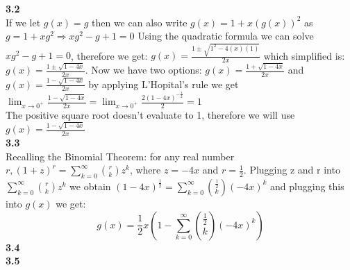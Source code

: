 \documentclass[10pt,a4paper]{report}
\begin{document}
	\newline
	\textbf{3.2}\\
	If we let $g(x) = g$ then we can also write $g(x) = 1 + x(g(x))^2$ as $g = 1 + xg^2 \Rightarrow xg^2 - g + 1 = 0$ Using the quadratic formula we can solve $xg^2 - g + 1 = 0$, therefore we get: $g(x) = \frac{1\pm\sqrt{1^2 - 4(x)(1)}}{2x}$ which simplified is: $g(x) = \frac{1\pm\sqrt{1-4x}}{2x}$.  Now we have two options: $g(x) = \frac{1 + \sqrt{1-4x}}{2x}$ and $g(x) = \frac{1 - \sqrt{1-4x}}{2x}$ by applying L'Hopital's rule we get $\lim_{x\to0^+}\frac{1-\sqrt{1-4x}}{2x} = \lim_{x\to0^+}\frac{2(1-4x)^{-\frac{1}{2}}}{2} = 1$\\
	The positive square root doesn't evaluate to 1, therefore we will use $g(x) = \frac{1 - \sqrt{1-4x}}{2x}$\\
	\newline
	\textbf{3.3}\\
	Recalling the Binomial Theorem: for any real number $r,(1+z)^r = \sum_{k=0}^{\infty}\binom{r}{k}z^k$, where $z = -4x$ and $r= \frac{1}{2}$.  Plugging z and r into $\sum_{k=0}^{\infty}\binom{r}{k}z^k$ we obtain $(1 - 4x)^{\frac{1}{2}} = \sum_{k=0}^{\infty}\binom{\frac{1}{2}}{k}(-4x)^k$ and plugging this into $g(x)$ we get:
	\[g(x) = \frac{1}{2}x(1 - \sum_{k=0}^{\infty}\binom{\frac{1}{2}}{k}(-4x)^k) \]
	\textbf{3.4}\\
	
	\textbf{3.5}\\
	
\end{document}
